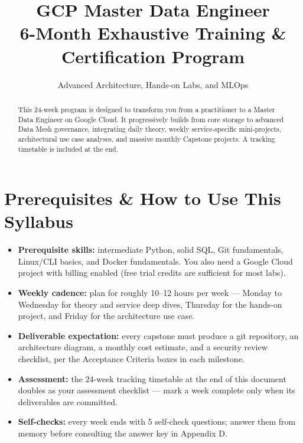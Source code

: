 \documentclass[11pt, a4paper]{article}
\title{\Huge \textbf{GCP Master Data Engineer}\\ \Large 6-Month Exhaustive Training \& Certification Program}
\author{Advanced Architecture, Hands-on Labs, and MLOps}
\date{}
\begin{document}
\maketitle

\begin{abstract}
\noindent This 24-week program is designed to transform you from a practitioner to a Master Data Engineer on Google Cloud. It progressively builds from core storage to advanced Data Mesh governance, integrating daily theory, weekly service-specific mini-projects, architectural use case analyses, and massive monthly Capstone projects. A tracking timetable is included at the end.
\end{abstract}

\tableofcontents
\newpage

\section*{Prerequisites \& How to Use This Syllabus}
\begin{itemize}[label=-]
    \item \textbf{Prerequisite skills:} intermediate Python, solid SQL, Git fundamentals, Linux/CLI basics, and Docker fundamentals. You also need a Google Cloud project with billing enabled (free trial credits are sufficient for most labs).
    \item \textbf{Weekly cadence:} plan for roughly 10--12 hours per week --- Monday to Wednesday for theory and service deep dives, Thursday for the hands-on project, and Friday for the architecture use case.
    \item \textbf{Deliverable expectation:} every capstone must produce a git repository, an architecture diagram, a monthly cost estimate, and a security review checklist, per the Acceptance Criteria boxes in each milestone.
    \item \textbf{Assessment:} the 24-week tracking timetable at the end of this document doubles as your assessment checklist --- mark a week complete only when its deliverables are committed.
    \item \textbf{Self-checks:} every week ends with 5 self-check questions; answer them from memory before consulting the answer key in Appendix D.
\end{itemize}
\end{document}
